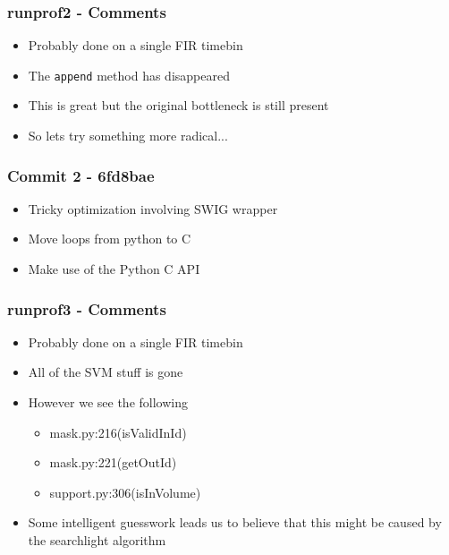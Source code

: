 \begin{frame}
 \frametitle{runprof2 - Comments}
  


\begin{itemize}
  \item Probably done on a single FIR timebin
  \item The \texttt{append} method has disappeared
  \item This is great but the original bottleneck is still present
  \item So lets try something more radical...
\end{itemize}

  
 \end{frame}
\begin{frame}
 \frametitle{Commit 2 - 6fd8bae}
  


\begin{itemize}
  \item Tricky optimization involving SWIG wrapper
  \item Move loops from python to C
  \item Make use of the Python C API
\end{itemize}

  
 \end{frame}
\begin{frame}
 \frametitle{runprof3 - Comments}
  


\begin{itemize}
  \item Probably done on a single FIR timebin
  \item All of the SVM stuff is gone
  \item However we see the following
\begin{itemize}
  \item mask.py:216(isValidInId)
  \item mask.py:221(getOutId)
  \item support.py:306(isInVolume)
\end{itemize}
  \item Some intelligent guesswork leads us to believe that this might be caused by the searchlight algorithm
\end{itemize}

  
 \end{frame}
